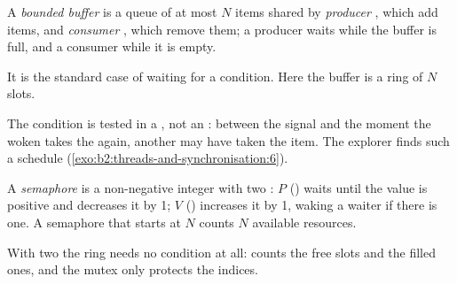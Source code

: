 \begin{definition}\label{def:b2:threads-and-synchronisation:bounded-buffer}
A \emph{bounded buffer} is a queue of at most $N$ items shared by \emph{producer} , which
add items, and \emph{consumer} , which remove them; a producer waits while the buffer is full, and a consumer
while it is empty.
\end{definition}

It is the standard case of waiting for a condition. Here the buffer is a ring of $N$ slots.



The condition is tested in a , not an : between the signal and the moment the woken  takes
the  again, another  may have taken the item. The explorer finds such a schedule
(\cref{exo:b2:threads-and-synchronisation:6}).

\begin{definition}[Semaphore]\label{def:b2:threads-and-synchronisation:semaphore}
A \emph{semaphore} is a non-negative integer with two : $P$ () waits
until the value is positive and decreases it by 1; $V$ () increases it by 1, waking a waiter if there
is one. A semaphore that starts at $N$ counts $N$ available resources.
\end{definition}

With two  the ring needs no condition at all:  counts the free slots and  the filled
ones, and the mutex only protects the indices.



